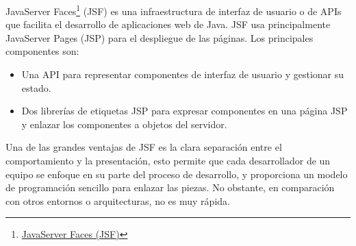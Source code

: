 JavaServer Faces\footnote{\href{https://www.juntadeandalucia.es/servicios/madeja/contenido/recurso/101}{JavaServer Faces (JSF)}} (JSF) es una infraestructura de interfaz de usuario o de APIs que facilita el desarrollo de aplicaciones web de Java. JSF usa principalmente JavaServer Pages (JSP) para el despliegue de las páginas. Los principales componentes son:
\begin{itemize}
    \item Una API para representar componentes de interfaz de usuario y gestionar su estado.
    \item Dos librerías de etiquetas JSP para expresar componentes en una página JSP y enlazar los componentes a objetos del servidor.
\end{itemize}
Una de las grandes ventajas de JSF es la clara separación entre el comportamiento y la presentación, esto permite que cada desarrollador de un equipo se enfoque en su parte del proceso de desarrollo, y proporciona un modelo de programación sencillo para enlazar las piezas. No obstante, en comparación con otros entornos o arquitecturas, no es muy rápida.